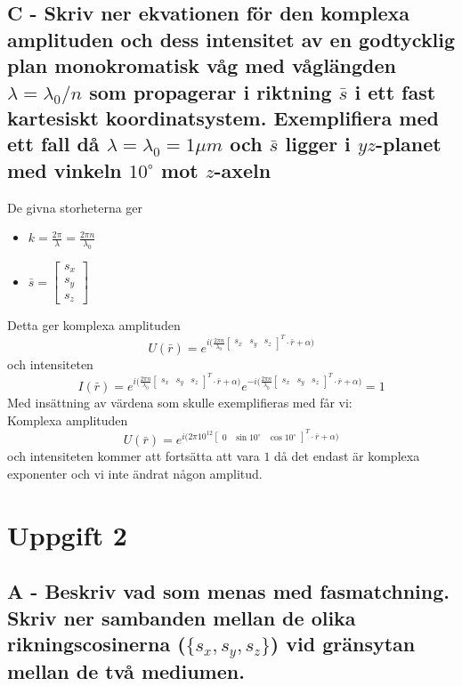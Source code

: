 \documentclass{article}
\begin{document}
  \subsection*{C - Skriv ner ekvationen för den komplexa amplituden och dess intensitet av en godtycklig plan monokromatisk våg med våglängden $\lambda=\lambda_0/n$ som propagerar i riktning $\bar{s}$ i ett fast kartesiskt koordinatsystem. Exemplifiera med ett fall då $\lambda=\lambda_0=1\mu m$ och $\bar{s}$ ligger i $yz$-planet med vinkeln $10^{\circ}$ mot $z$-axeln}
    De givna storheterna ger
    \begin{itemize}
      \item $k=\frac{2\pi}{\lambda}=\frac{2\pi n}{\lambda_0}$
      \item $\bar{s}=\begin{bmatrix}
        s_x\\
        s_y\\
        s_z
      \end{bmatrix}$
    \end{itemize}
    Detta ger komplexa amplituden
    \[
      U(\bar{r})=e^{i\big(\frac{2\pi n}{\lambda_0}\begin{bmatrix}
        s_x & s_y & s_z
      \end{bmatrix}^T\cdot\bar{r}+\alpha\big)}
    \]
    och intensiteten
    \[
      I(\bar{r})=e^{i\big(\frac{2\pi n}{\lambda_0}\begin{bmatrix}
        s_x & s_y & s_z
      \end{bmatrix}^T\cdot\bar{r}+\alpha\big)}e^{-i\big(\frac{2\pi n}{\lambda_0}\begin{bmatrix}
        s_x & s_y & s_z
      \end{bmatrix}^T\cdot\bar{r}+\alpha\big)}=1
    \]
    Med insättning av värdena som skulle exemplifieras med får vi:\\
    Komplexa amplituden
    \[
      U(\bar{r})=e^{i\big(2\pi 10^{12}\begin{bmatrix}
        0 & \sin{10^{\circ}} & \cos{10^{\circ}}
      \end{bmatrix}^T\cdot\bar{r}+\alpha\big)}
    \]
    och intensiteten kommer att fortsätta att vara $1$ då det endast är komplexa exponenter och vi inte ändrat någon amplitud.

\newpage
\section*{Uppgift 2}
  \subsection*{A - Beskriv vad som menas med fasmatchning. Skriv ner sambanden mellan de olika rikningscosinerna ($\{s_x,s_y,s_z\}$) vid gränsytan mellan de två mediumen.}
\end{document}
